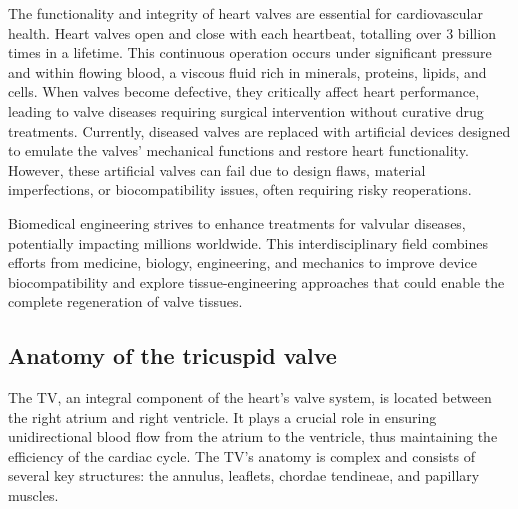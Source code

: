 The functionality and integrity of heart valves are essential for cardiovascular health. Heart valves open and close with each heartbeat, totalling over 3 billion times in a lifetime. This continuous operation occurs under significant pressure and within flowing blood, a viscous fluid rich in minerals, proteins, lipids, and cells. When valves become defective, they critically affect heart performance, leading to valve diseases requiring surgical intervention without curative drug treatments. Currently, diseased valves are replaced with artificial devices designed to emulate the valves' mechanical functions and restore heart functionality. However, these artificial valves can fail due to design flaws, material imperfections, or biocompatibility issues, often requiring risky reoperations. ~

Biomedical engineering strives to enhance treatments for valvular diseases, potentially impacting millions worldwide. This interdisciplinary field combines efforts from medicine, biology, engineering, and mechanics to improve device biocompatibility and explore tissue-engineering approaches that could enable the complete regeneration of valve tissues. ~


\subsection{Anatomy of the tricuspid valve}
The \gls{TV}, an integral component of the heart's valve system, is located between the right atrium and right ventricle. It plays a crucial role in ensuring unidirectional blood flow from the atrium to the ventricle, thus maintaining the efficiency of the cardiac cycle. The \gls{TV}'s anatomy is complex and consists of several key structures: the annulus, leaflets, chordae tendineae, and papillary muscles.


